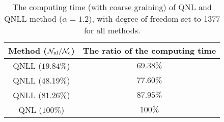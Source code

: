 \begin{table}
	\centering
	\renewcommand{\arraystretch}{1.5} %
	\begin{tabular}{|c|c|} %
		\hline %
		Method ($\mathcal{N}_{{\rm nl}}/\mathcal{N}_{{\rm c}}$) & The ratio of the computing time\\ %
		\hline %
		QNLL ($19.84\%$) & $69.38\%$ \\ %
		QNLL ($48.19\%$) & $77.60\%$ \\ %
		QNLL ($81.26\%$) & $87.95\%$ \\ %
		QNL ($100\%$) & $100\%$ \\ %
		\hline %
	\end{tabular}
	\caption{The computing time (with coarse graining) of QNL and QNLL method ($\alpha = 1.2$), with degree of freedom set to 1377 for all methods.}
	\label{tab:computing time alpha12 CG}
\end{table}



